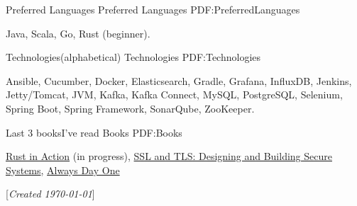 \documentclass[letterpaper,MMMyyyy,nonstopmode]{simpleresumecv}
\newcommand{\CVNote}{Created {\today}}
\begin{document}
\begin{Body}
\BigGap


\Section
{Preferred Languages}
{Preferred Languages}
{PDF:PreferredLanguages}

\Entry
Java,
Scala,
Go,
Rust (beginner).

\BigGap


\Section
{Technologies\newline (alphabetical)}
{Technologies}
{PDF:Technologies}

\Entry
Ansible,
Cucumber,
Docker,
Elasticsearch,
Gradle,
Grafana,
InfluxDB,
Jenkins,
Jetty/Tomcat,
JVM,
Kafka,
Kafka Connect,
MySQL,
PostgreSQL,
Selenium,
Spring Boot,
Spring Framework,
SonarQube,
ZooKeeper.
\BigGap


\Section
{Last 3 books\newline I've read}
{Books}
{PDF:Books}


\Entry
\href{https://www.manning.com/books/rust-in-action}{Rust in Action} (in progress), 
\href{https://smile.amazon.com/gp/product/0201615983}{SSL and TLS: Designing and Building Secure Systems}, 
\href{https://smile.amazon.com/Always-Day-One-Titans-Forever/dp/0593083482}{Always Day One}

\BigGap


\end{Body}


\BigGap
\UseNoteFont%
\null\hfill%
[\textit{\CVNote}]
\end{document}
